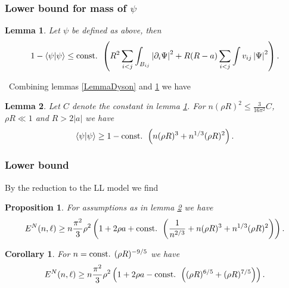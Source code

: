 \documentclass{beamer}[10]
\newcommand{\abs}[1]{\left\lvert #1 \right\rvert}
\renewcommand{\braket}[1]{\left\langle#1\right\rangle}
\newtheorem{mproposition}{Proposition}
\newtheorem{mlemma}{Lemma}
\newtheorem{mcorollary}{Corollary}
\begin{document}
\begin{frame}
	\frametitle{Lower bound for mass of $ \psi $}
	\begin{block}{}\vspace{-0.5cm}
			\small\begin{mlemma}\label{LemmaNormLoss}
				Let $ \psi $ be defined as above, then \begin{equation}
				1-\braket{\psi|\psi}\leq\textnormal{const. } \left(R^2\sum_{i<j}\int_{B_{ij}}\abs{\partial_i \Psi}^2+R(R-a)\sum_{i<j}\int v_{ij} \abs{\Psi}^2\right).
				\end{equation}
			\end{mlemma}
			\
			Combining lemmas \ref{LemmaDyson} and \ref{LemmaNormLoss} we have 
			\begin{mlemma}\label{LemmaImprovedMassBound}
				Let $ C $ denote the constant in lemma \ref{LemmaNormLoss}. For $ n(\rho R)^2\leq  \frac{3}{16\pi^2}C $, $ \rho R\ll 1 $ and $ R>2\abs{a} $ we have
				\begin{equation}\label{EqImprovedMassBound}
				\begin{aligned}
				\braket{\psi|\psi} \geq 1-\textnormal{const. }\left(n(\rho R)^3+n^{1/3}(\rho R)^2\right).
				\end{aligned}
				\end{equation}
			\end{mlemma}
	\end{block}	
\end{frame}

\begin{frame}
	\frametitle{Lower bound}
	\begin{block}{}
	\small	By the reduction to the LL model we find 
		\begin{mproposition}\label{PropositionLowerBoundSpecN}
			For assumptions as in lemma \ref{LemmaImprovedMassBound} we have \begin{equation}
			E^N(n,\ell)\geq n\frac{\pi^2}{3}\rho^2\left(1+2\rho a+\textnormal{const. }\left(\frac{1}{n^{2/3}}+n(\rho R)^3+n^{1/3}(\rho R)^2\right)\right).
			\end{equation}
		\end{mproposition}
		\begin{mcorollary} \label{CorollaryLowerBoundSpecN}
			For $ n=\textnormal{const. } (\rho R)^{-9/5} $ we have 
			\begin{equation}
			E^N(n,\ell)\geq n\frac{\pi^2}{3}\rho^2\left(1+2\rho a-\textnormal{const. }\left((\rho R)^{6/5}+(\rho R)^{7/5}\right)\right).
			\end{equation}
		\end{mcorollary}
	\end{block}	
\end{frame}
\end{document}
